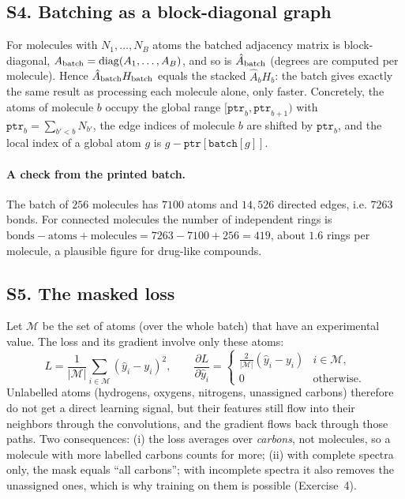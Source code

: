 \documentclass[11pt]{article}
\newcommand{\Ah}{\hat{A}}
\begin{document}
\label{sec:S4}
\subsection*{S4. Batching as a block-diagonal graph}
For molecules with $N_1,\dots,N_B$ atoms the batched adjacency matrix is block-diagonal, $A_{\rm batch}=\operatorname{diag}(A_1,\dots,A_B)$, and so is $\Ah_{\rm batch}$ (degrees are computed per molecule). Hence $\Ah_{\rm batch}H_{\rm batch}$ equals the stacked $\Ah_bH_b$: the batch gives exactly the same result as processing each molecule alone, only faster. Concretely, the atoms of molecule $b$ occupy the global range $[\texttt{ptr}_b,\texttt{ptr}_{b+1})$ with $\texttt{ptr}_b=\sum_{b'<b}N_{b'}$, the edge indices of molecule $b$ are shifted by $\texttt{ptr}_b$, and the local index of a global atom $g$ is $g-\texttt{ptr}[\texttt{batch}[g]]$.

\paragraph{A check from the printed batch.} The batch of $256$ molecules has $7100$ atoms and $14{,}526$ directed edges, i.e. $7263$ bonds. For connected molecules the number of independent rings is $\text{bonds}-\text{atoms}+\text{molecules}=7263-7100+256=419$, about $1.6$ rings per molecule, a plausible figure for drug-like compounds.

\label{sec:S5}
\subsection*{S5. The masked loss}
Let $\mathcal M$ be the set of atoms (over the whole batch) that have an experimental value. The loss and its gradient involve only these atoms:
\[
  L=\frac1{|\mathcal M|}\sum_{i\in\mathcal M}(\hat y_i-y_i)^2,\qquad
  \frac{\partial L}{\partial\hat y_i}=\begin{cases}\frac{2}{|\mathcal M|}(\hat y_i-y_i)&i\in\mathcal M,\\0&\text{otherwise.}\end{cases}
\]
Unlabelled atoms (hydrogens, oxygens, nitrogens, unassigned carbons) therefore do not get a direct learning signal, but their features still flow into their neighbors through the convolutions, and the gradient flows back through those paths. Two consequences: (i) the loss averages over \emph{carbons}, not molecules, so a molecule with more labelled carbons counts for more; (ii) with complete spectra only, the mask equals ``all carbons''; with incomplete spectra it also removes the unassigned ones, which is why training on them is possible (Exercise~4).
\end{document}
